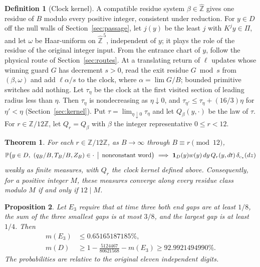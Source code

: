 \documentclass[11pt,reqno]{amsart}
\newtheorem{theorem}{Theorem}
\newtheorem{proposition}[theorem]{Proposition}
\theoremstyle{definition}
\newtheorem*{definition}{Definition}
\newcommand{\Prob}{\mathbb P}
\newcommand{\Z}{\mathbb Z}
\newcommand{\cen}{c_*}
\newcommand{\one}{\mathbf 1}
\newcommand{\T}{T_B}
\newcommand{\ZB}{Z_B}
\newcommand{\Zhat}{\widehat{\Z}}
\begin{document}
\begin{definition}[Clock kernel]
A compatible residue system \(\beta\in\Zhat\) gives one residue of \(B\)
modulo every positive integer, consistent under reduction. For \(y\in D\)
off the null walls of Section~\ref{sec:passage}, let \(j(y)\) be the least
\(j\) with \(K^jy\in\Pi\), and let \(\omega\) be Haar-uniform on
\(\Zhat^{\,5}\), independent of \(y\); it plays the role of the residue of
the original integer input. From the entrance chart of \(y\), follow the
physical route of Section~\ref{sec:routes}. At a translating return of
\(\ell\) updates whose winning guard \(G\) has decrement \(s>0\), read the
exit residue \(G\bmod s\) from \((\beta,\omega)\) and add \(\ell\alpha/s\)
to the clock, where \(\alpha=\lim G/B\); bounded primitive switches add
nothing. Let \(\tau_\eta\) be the clock at the first visited section of
leading radius less than \(\eta\). Then \(\tau_\eta\) is nondecreasing as
\(\eta\downarrow0\), and \(\tau_{\eta'}\le\tau_\eta+(16/3)\eta\) for
\(\eta'<\eta\) (Section~\ref{sec:kernel}). Put
\(\tau=\lim_{\eta\downarrow0}\tau_\eta\) and let \(Q_\beta(y,\cdot)\) be
the law of \(\tau\). For \(r\in\Z/12\Z\), let \(Q_r=Q_\beta\) with \(\beta\)
the integer representative \(0\le r<12\).
\end{definition}

\begin{theorem}\label{th:main}
For each \(r\in\Z/12\Z\), as \(B\to\infty\) through \(B\equiv r\pmod{12}\),
\[
 \Prob\bigl(y\in D,\ (q_B/B,\T/B,\ZB)\in\cdot
       \,\bigm|\,\text{nonconstant word}\bigr)
 \ \Longrightarrow\
 \one_D(y)w(y)\,dy\,Q_r(y,dt)\,\delta_{\cen}(dz)
\]
weakly as finite measures, with \(Q_r\) the clock kernel defined above.
Consequently, for a positive integer \(M\), these measures converge along
every residue class modulo \(M\) if and only if \(12\mid M\).
\end{theorem}

\begin{proposition}\label{prop:mass}
Let \(E_3\) require that at time three both end gaps are at least \(1/8\), the
sum of the three smallest gaps is at most \(3/8\), and the largest gap is at
least \(1/4\). Then
\[
 \begin{split}
 m(E_3)&\le 0.65165187185\%,\\
 m(D)&\ge 1-\frac{5124467}{80621568}-m(E_3)\ge 92.9921494990\%.
 \end{split}
\]
The probabilities are relative to the original eleven independent digits.
\end{proposition}
\end{document}
